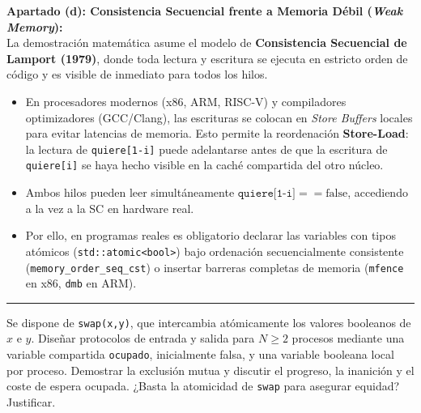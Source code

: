 \documentclass[11pt,a4paper,twoside,openright]{report}
\begin{document}
\begin{solucion}
\textbf{Apartado (d): Consistencia Secuencial frente a Memoria Débil (\emph{Weak Memory}):}\\
La demostración matemática asume el modelo de \textbf{Consistencia Secuencial de Lamport (1979)}, donde toda lectura y escritura se ejecuta en estricto orden de código y es visible de inmediato para todos los hilos.
\begin{itemize}[leftmargin=*]
    \item En procesadores modernos (x86, ARM, RISC-V) y compiladores optimizadores (GCC/Clang), las escrituras se colocan en \emph{Store Buffers} locales para evitar latencias de memoria. Esto permite la reordenación \textbf{Store-Load}: la lectura de \texttt{quiere[1-i]} puede adelantarse antes de que la escritura de \texttt{quiere[i]} se haya hecho visible en la caché compartida del otro núcleo.
    \item Ambos hilos pueden leer simultáneamente $\texttt{quiere[1-i]} == \text{false}$, accediendo a la vez a la SC en hardware real.
    \item Por ello, en programas reales es obligatorio declarar las variables con tipos atómicos (\texttt{std::atomic<bool>}) bajo ordenación secuencialmente consistente (\texttt{memory\_order\_seq\_cst}) o insertar barreras completas de memoria (\texttt{mfence} en x86, \texttt{dmb} en ARM).
\end{itemize}
\end{solucion}

\vspace{15pt}
\hrule
\vspace{15pt}

\begin{ejercicio}
Se dispone de \texttt{swap(x,y)}, que intercambia atómicamente los valores booleanos de $x$ e $y$. Diseñar protocolos de entrada y salida para $N \ge 2$ procesos mediante una variable compartida \texttt{ocupado}, inicialmente falsa, y una variable booleana local por proceso. Demostrar la exclusión mutua y discutir el progreso, la inanición y el coste de espera ocupada. ¿Basta la atomicidad de \texttt{swap} para asegurar equidad? Justificar.
\end{ejercicio}
\end{document}
